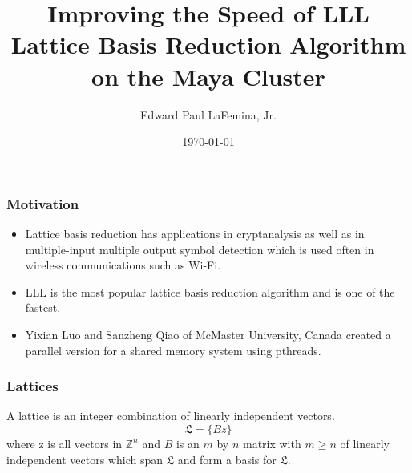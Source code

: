 \documentclass{beamer}
\title{Improving the Speed of LLL Lattice Basis Reduction Algorithm on the Maya Cluster}
\author{Edward Paul LaFemina, Jr.}
\institute{University Maryland, Baltimore County}
\date{\today}
\begin{document}
\begin{frame}
\titlepage
\end{frame}

\begin{frame}
\frametitle{Motivation}
\begin{itemize}
\item Lattice basis reduction has applications in cryptanalysis as well as in multiple-input multiple output symbol detection which is used often in wireless communications such as Wi-Fi.
\item LLL is the most popular lattice basis reduction algorithm and is one of the fastest.
\item Yixian Luo and Sanzheng Qiao of McMaster University, Canada created a parallel version for a shared memory system using pthreads. \cite{LuoQiaoParallelLLL}
\end{itemize}
\end{frame}

\begin{frame}
\frametitle{Lattices}
\begin{definition}
A lattice is an integer combination of linearly independent vectors.
$$\mathfrak{L} = \{Bz\}$$
where z is all vectors in $\mathbb{Z}^n$ and $B$ is an $m$ by $n$ matrix with $m\geq n$ of linearly independent vectors which span $\mathfrak{L}$ and form a basis for $\mathfrak{L}$.
\end{definition}
\end{frame}
\end{document}
